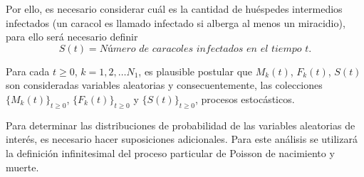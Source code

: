 Por ello, es necesario considerar cuál es la cantidad de huéspedes intermedios infectados (un caracol es llamado infectado si alberga al menos un miracidio), para ello será necesario definir $$S(t)= \textit{Número de caracoles infectados en el tiempo $t$.}$$
\begin{Obs}
   Para cada $t\geq 0$, $k=1,2,\ldots N_1$, es plausible postular que $M_k(t)$, $F_k(t)$, $S(t)$ son consideradas variables aleatorias y consecuentemente, las colecciones $\{M_k(t)\}_{t\geq 0}$, $\{F_k(t)\}_{t\geq 0}$ y $\{S(t)\}_{t\geq 0}$, procesos estocásticos.
\end{Obs}
Para determinar las distribuciones de probabilidad de las variables aleatorias de interés, es necesario hacer suposiciones adicionales.
Para este análisis se utilizará la definición infinitesimal del proceso particular de Poisson de nacimiento y muerte.
